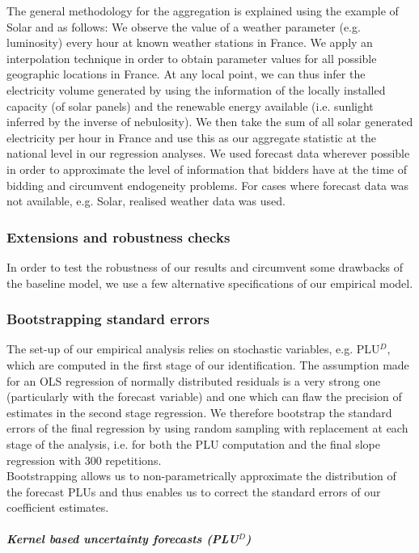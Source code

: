 The general methodology for the aggregation is explained using the example of Solar and as follows: We observe the value of a weather parameter (e.g. luminosity) every hour at known weather stations in France. 
We apply an interpolation technique in order to obtain parameter values for all possible geographic locations in France. At any local point, we can thus infer the electricity volume generated by using the information of the locally installed capacity (of solar panels) and the renewable energy available (i.e. sunlight inferred by the inverse of nebulosity). We then take the sum of all solar generated electricity per hour in France and use this as our aggregate statistic at the national level in our regression analyses. 
We used forecast data wherever possible in order to approximate the level of information that bidders have at the time of bidding and circumvent endogeneity problems. 
For cases where forecast data was not available, e.g. Solar, realised weather data was used. 


\subsubsection{Extensions and robustness checks}
In order to test the robustness of our results and circumvent some drawbacks of the baseline model, we use a few alternative specifications of our empirical model. 

\subsubsection{Bootstrapping standard errors}
The set-up of our empirical analysis relies on stochastic variables, e.g. PLU$^D$, which are computed in the first stage of our identification. The assumption made for an OLS regression of normally distributed residuals is a very strong one (particularly with the forecast variable) and one which can flaw the precision of estimates in the second stage regression. We therefore bootstrap the standard errors of the final regression by using random sampling with replacement at each stage of the analysis, i.e. for both the PLU computation and the final slope regression with 300 repetitions. \\

Bootstrapping allows us to non-parametrically approximate the distribution of the forecast PLUs and thus enables us to correct the standard errors of our coefficient estimates. 

\subparagraph{Kernel based uncertainty forecasts (PLU$^D$)}
\label{robustunc}

